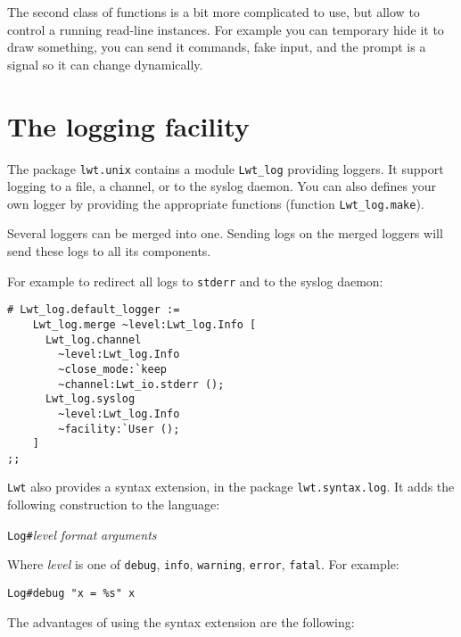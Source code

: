 \documentclass{article}
\newcommand{\lwt}{\texttt{Lwt}\xspace}
\begin{document}
The second class of functions is a bit more complicated to use, but
allow to control a running read-line instances. For example you can
temporary hide it to draw something, you can send it commands, fake
input, and the prompt is a signal so it can change dynamically.

\section{The logging facility}
\label{lwt.log}

The package \texttt{lwt.unix} contains a module \texttt{Lwt\_log}
providing loggers. It support logging to a file, a channel, or to the
syslog daemon. You can also defines your own logger by providing the
appropriate functions (function \texttt{Lwt\_log.make}).

Several loggers can be merged into one. Sending logs on the merged
loggers will send these logs to all its components.

For example to redirect all logs to \texttt{stderr} and to the syslog
daemon:

\begin{verbatim}
# Lwt_log.default_logger :=
    Lwt_log.merge ~level:Lwt_log.Info [
      Lwt_log.channel
        ~level:Lwt_log.Info
        ~close_mode:`keep
        ~channel:Lwt_io.stderr ();
      Lwt_log.syslog
        ~level:Lwt_log.Info
        ~facility:`User ();
    ]
;;
\end{verbatim}

\lwt also provides a syntax extension, in the package
\texttt{lwt.syntax.log}. It adds the following construction to the
language:

\begin{center}
  \texttt{Log\#}\textit{level} \textit{format} \textit{arguments}
\end{center}

Where \textit{level} is one of \texttt{debug}, \texttt{info},
\texttt{warning}, \texttt{error}, \texttt{fatal}. For example:

\begin{verbatim}
Log#debug "x = %s" x
\end{verbatim}

The advantages of using the syntax extension are the following:
\end{document}
